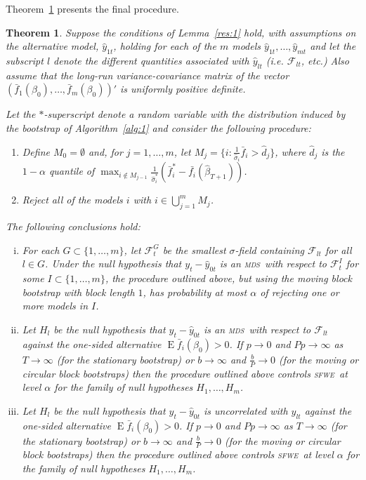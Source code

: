 \documentclass[11pt,fleqn]{article}
\newtheorem{thm}{Theorem}
\theoremstyle{definition}
\DeclareMathOperator{\E}{E}
\newcommand{\mds}{\textsc{mds}}
\newcommand{\sfwe}{\textsc{sfwe}}
\begin{document}
Theorem~\ref{res:2} presents the final procedure.

\begin{thm}\label{res:2}
  Suppose the conditions of Lemma~\ref{res:1} hold, with assumptions
  on the alternative model, $\hat{y}_{1t}$, holding for each of the
  $m$ models $\hat{y}_{1t}, \dots, \hat{y}_{mt}$ and let the subscript
  $l$ denote the different quantities associated with $\hat{y}_{lt}$
  (i.e. $\mathcal{F}_{lt}$, etc.)  Also assume that the long-run
  variance-covariance matrix of the vector
  $(\bar{f}_1(\beta_0),\dots,\bar{f}_m(\beta_0))'$ is uniformly
  positive definite.

  Let the $*$-superscript denote a random variable with the
  distribution induced by the bootstrap of Algorithm~\ref{alg:1} and
  consider the following procedure:
  \begin{enumerate}
  \item Define $M_0 = \emptyset$ and, for $j = 1,\dots,m$, let $M_j =
    \{i : \tfrac1{\hat\sigma_i} \bar{f}_{i} > \hat{d}_j\}$, where
    $\hat{d}_j$ is the $1-\alpha$ quantile of $\max_{i \notin M_{j-1}}
    \tfrac{1}{\hat{\sigma}_i^{*}}(\bar{f}_{i}^{*} -
    \bar{f_i}(\hat{\beta}_{T+1}))$.
  \item Reject all of the models $i$ with $i \in \bigcup_{j=1}^m M_j$.
  \end{enumerate}
  The following conclusions hold:
  \begin{enumerate}[i.]
  \item\label{it:1} For each $G \subset \{1,\dots,m\}$, let
    $\mathcal{F}_t^G$ be the smallest $\sigma$-field containing
    $\mathcal{F}_{lt}$ for all $l \in G$.  Under the null hypothesis
    that $y_t - \hat{y}_{0t}$ is an \mds\ with respect to
    $\mathcal{F}_t^I$ for some $I \subset \{1,\dots,m\}$, the
    procedure outlined above, but using the moving block bootstrap
    with block length $1$, has probability at most $\alpha$ of
    rejecting one or more models in $I$.
  \item\label{it:2} Let $H_l$ be the null hypothesis that $y_t -
    \hat{y}_{0t}$ is an \mds\ with respect to
    $\mathcal{F}_{lt}$ against the one-sided alternative $\E \bar
    f_i(\beta_0) > 0$.  If $p \to 0$ and $P p \to \infty$ as $T \to
    \infty$ (for the stationary bootstrap) or $b \to \infty$ and
    $\frac{b}{P} \to 0$ (for the moving or circular block bootstraps)
    then the procedure outlined above controls \sfwe\ at level
    $\alpha$ for the family of null hypotheses $H_1,\dots,H_m$.
  \item\label{it:3} Let $H_l$ be the null hypothesis that $y_t -
    \hat{y}_{0t}$ is uncorrelated with $\hat{y}_{lt}$ against the
    one-sided alternative $\E \bar f_i(\beta_0) > 0$.  If $p \to 0$
    and $P p \to \infty$ as $T \to \infty$ (for the stationary
    bootstrap) or $b \to \infty$ and $\frac{b}{P} \to 0$ (for the
    moving or circular block bootstraps) then the procedure outlined
    above controls \sfwe\ at level $\alpha$ for the family of
    null hypotheses $H_1,\dots,H_m$.
  \end{enumerate}
\end{thm}
\end{document}
